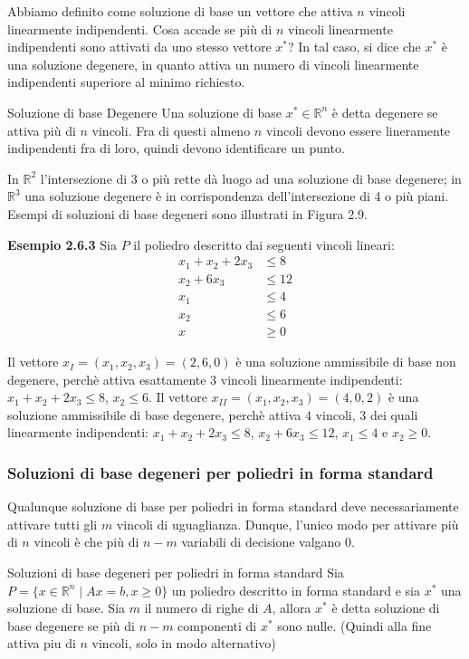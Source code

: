 Abbiamo definito come soluzione di base un vettore che attiva $n$ vincoli linearmente indipendenti. Cosa accade se più di $n$ vincoli linearmente indipendenti sono attivati da uno stesso vettore $x^*$? In tal caso, si dice che $x^*$ è una soluzione degenere, in quanto attiva un numero di vincoli linearmente indipendenti superiore al minimo richiesto.

\begin{definition}{Soluzione di base Degenere}
Una soluzione di base $x^* \in \mathbb{R}^n$ è detta degenere se attiva più di $n$ vincoli. Fra di questi almeno $n$ vincoli devono essere lineramente indipendenti fra di loro, quindi devono identificare un punto.

In $\mathbb{R}^2$ l'intersezione di 3 o più rette dà luogo ad una soluzione di base degenere; in $\mathbb{R}^3$ una soluzione degenere è in corrispondenza dell'intersezione di 4 o più piani. Esempi di soluzioni di base degeneri sono illustrati in Figura 2.9.
\end{definition}
\textbf{Esempio 2.6.3} Sia $P$ il poliedro descritto dai seguenti vincoli lineari:
\begin{align*}
x_1 + x_2 + 2x_3 &\le 8 \\
x_2 + 6x_3 &\le 12 \\
x_1 &\le 4 \\
x_2 &\le 6 \\
x &\ge 0
\end{align*}

Il vettore $x_{I} = (x_1, x_2, x_3) = (2, 6, 0)$ è una soluzione ammissibile di base non degenere, perchè attiva esattamente 3 vincoli linearmente indipendenti: $x_1 + x_2 + 2x_3 \le 8$, $x_2 \le 6$. Il vettore $x_{II} = (x_1, x_2, x_3) = (4, 0, 2)$ è una soluzione ammissibile di base degenere, perchè attiva 4 vincoli, 3 dei quali linearmente indipendenti: $x_1 + x_2 + 2x_3 \le 8$, $x_2 + 6x_3 \le 12$, $x_1 \le 4$ e $x_2 \ge 0$.

\subsubsection*{Soluzioni di base degeneri per poliedri in forma standard}

Qualunque soluzione di base per poliedri in forma standard deve necessariamente attivare tutti gli $m$ vincoli di uguaglianza. Dunque, l'unico modo per attivare più di $n$ vincoli è che più di $n-m$ variabili di decisione valgano 0.

\begin{definition}{Soluzioni di base degeneri per poliedri in forma standard}
Sia $P = \{x \in \mathbb{R}^n \mid Ax=b, x \ge 0\}$ un poliedro descritto in forma standard e sia $x^*$ una soluzione di base. Sia $m$ il numero di righe di $A$, allora $x^*$ è detta soluzione di base degenere se più di $n-m$ componenti di $x^*$ sono nulle.
(Quindi alla fine attiva piu di $n$ vincoli, solo in modo alternativo)
\end{definition}


